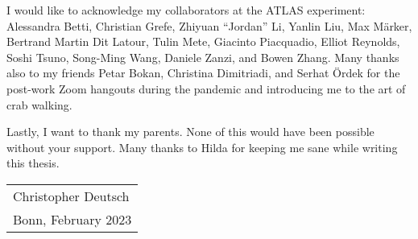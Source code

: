I would like to acknowledge my collaborators at the ATLAS experiment: Alessandra
Betti, Christian Grefe, Zhiyuan ``Jordan'' Li, Yanlin Liu, Max Märker, Bertrand
Martin Dit Latour, Tulin Mete, Giacinto Piacquadio, Elliot Reynolds, Soshi
Tsuno, Song-Ming Wang, Daniele Zanzi, and Bowen Zhang. Many thanks also to my
\bbtautau friends Petar Bokan, Christina Dimitriadi, and Serhat Ördek for the
post-work Zoom hangouts during the pandemic and introducing me to the art of
crab walking.

Lastly, I want to thank my parents. None of this would have been possible
without your support. Many thanks to Hilda for keeping me sane while writing
this thesis.

\vspace*{4\baselineskip}

\hfill%
\begin{tabular}{l}
  Christopher Deutsch \\
  Bonn, February 2023
\end{tabular}

